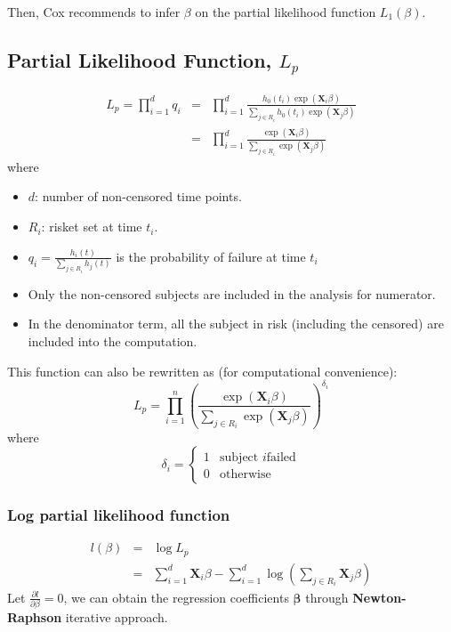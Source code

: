 \documentclass[11pt,addpoints,answers]{exam}
\begin{document}
\begin{CJK*}{UTF8}{gbsn}
Then, Cox recommends to infer $\beta$ on the partial likelihood function $L_1(\beta)$.


\subsection{Partial Likelihood Function, $L_p$}

$$
\begin{array}{lcl}
L_p = \prod_{i=1}^d q_i &=& \prod_{i=1}^d \frac{h_0(t_i) \exp(\mathbf{X}_i \beta)}{\sum_{j \in R_i} h_0(t_i) \exp(\mathbf{X}_j \beta)}\\
&=& \prod_{i=1}^d \frac{\exp(\mathbf{X}_i \beta)}{\sum_{j \in R_i} \exp(\mathbf{X}_j \beta)}
\end{array}
$$
where
\begin{itemize}
	\item $d$: number of non-censored time points.
	\item $R_i$: risket set at time $t_i$.
	\item $q_i = \frac{h_i(t)}{\sum_{j \in R_i} h_j(t)}$ is the probability of failure at time $t_i$ 
	\item Only the non-censored subjects are included in the analysis for numerator.
	\item In the denominator term, all the subject in risk (including the censored) are 
		included into the computation.
\end{itemize}

This function can also be rewritten as (for computational convenience):
$$
L_p = \prod_{i=1}^n \left( \frac{\exp(\mathbf{X}_i \beta)}{\sum_{j \in R_i} \exp(\mathbf{X}_j \beta)} \right)^{\delta_i}
$$
where
$$
\delta_i = \begin{cases}
1 & \mbox{subject }i \mbox{failed}\\
0 & \mbox{otherwise}
\end{cases}
$$

\subsubsection{Log partial likelihood function}
$$
\begin{array}{lcl}
l(\beta) &=& \log L_p\\
&=& \sum_{i=1}^d \mathbf{X}_i \beta - \sum_{i=1}^d \log \left( \sum_{j \in R_i} \mathbf{X}_j\beta \right)
\end{array}
$$
Let $\frac{\partial l}{\partial \beta} = 0$, we can obtain the regression coefficients $\mathbf{\beta}$ 
through \textbf{Newton-Raphson} iterative approach.



\end{CJK*}
\end{document}
